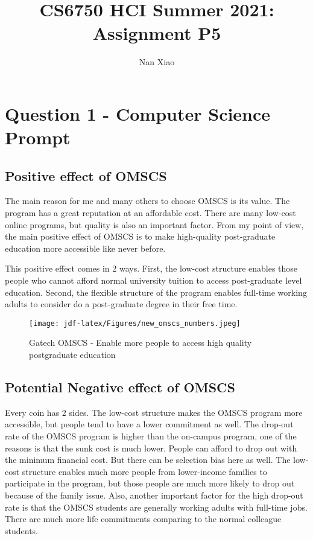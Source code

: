 \documentclass[
	letterpaper, %
]{jdf}
\author{Nan Xiao}
\title{CS6750 HCI Summer 2021:\\Assignment P5}
\begin{document}

\maketitle

\section{Question 1 - Computer Science Prompt}
\subsection{Positive effect of OMSCS}
The main reason for me and many others to choose OMSCS is its value. The program has a great reputation at an affordable cost. There are many low-cost online programs, but quality is also an important factor. From my point of view, the main positive effect of OMSCS is to make high-quality post-graduate education more accessible like never before. 

This positive effect comes in 2 ways. First, the low-cost structure enables those people who cannot afford normal university tuition to access post-graduate level education. Second, the flexible structure of the program enables full-time working adults to consider do a post-graduate degree in their free time.

\begin{figure}[h]
	\centering
	\texttt{[image: jdf-latex/Figures/new\_omscs\_numbers.jpeg]}
	\caption{Gatech OMSCS - Enable more people to access high quality postgraduate education}
	\label{fig:omscs}
\end{figure}

\subsection{Potential Negative effect of OMSCS}
Every coin has 2 sides. The low-cost structure makes the OMSCS program more accessible, but people tend to have a lower commitment as well. The drop-out rate of the OMSCS program is higher than the on-campus program, one of the reasons is that the sunk cost is much lower. People can afford to drop out with the minimum financial cost.
But there can be selection bias here as well. The low-cost structure enables much more people from lower-income families to participate in the program, but those people are much more likely to drop out because of the family issue. Also, another important factor for the high drop-out rate is that the OMSCS students are generally working adults with full-time jobs. There are much more life commitments comparing to the normal colleague students.
\end{document}
